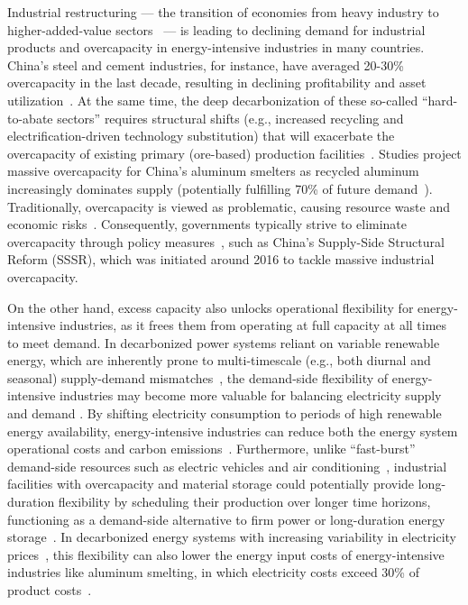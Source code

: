 \documentclass[preprint]{elsarticle}
\begin{document}
Industrial restructuring — the transition of economies from heavy industry to higher-added-value sectors~\citep{tan2024toward} — is leading to declining demand for industrial products and overcapacity in energy-intensive industries in many countries. China's steel and cement industries, for instance, have averaged 20-30\% overcapacity in the last decade, resulting in declining profitability and asset utilization~\citep{xie2023impact}. At the same time, the deep decarbonization of these so-called ``hard-to-abate sectors'' requires structural shifts (e.g., increased recycling and electrification-driven technology substitution) that will exacerbate the overcapacity of existing primary (ore-based) production facilities~\citep{nilsson_industrial_2021, meng_technologies_2025, bataille_review_2018, wesseling_transition_2017}. Studies project massive overcapacity for China's aluminum smelters as recycled aluminum increasingly dominates supply (potentially fulfilling 70\% of future demand~\citep{li_when_2020, liu_stock_2013}). Traditionally, overcapacity is viewed as problematic, causing resource waste and economic risks~\citep{yu2020environmental}. Consequently, governments typically strive to eliminate overcapacity through policy measures~\citep{guo2022uncovering}, such as China's Supply-Side Structural Reform (SSSR), which was initiated around 2016 to tackle massive industrial overcapacity.

On the other hand, excess capacity also unlocks operational flexibility for energy-intensive industries, as it frees them from operating at full capacity at all times to meet demand. In decarbonized power systems reliant on variable renewable energy, which are inherently prone to multi-timescale (e.g., both diurnal and seasonal) supply-demand mismatches~\citep{cole_quantifying_2021, denholm_challenges_2021}, the demand-side flexibility of energy-intensive industries may become more valuable for balancing electricity supply and demand \citep{kondziella2016flexibility}. By shifting electricity consumption to periods of high renewable energy availability, energy-intensive industries can reduce both the energy system operational costs and carbon emissions~\citep{golmohamadi_demand-side_2022}. Furthermore, unlike “fast-burst” demand-side resources such as electric vehicles and air conditioning~\citep{van_heerden_demand-side_2025}, industrial facilities with overcapacity and material storage could potentially provide long-duration flexibility by scheduling their production over longer time horizons, functioning as a demand-side alternative to firm power or long-duration energy storage~\citep{sepulveda_role_2018, jenkins_long-duration_2021}. In decarbonized energy systems with increasing variability in electricity prices~\citep{Bistline2021VariabilityID, dardor_modelling_2026}, this flexibility can also lower the energy input costs of energy-intensive industries like aluminum smelting, in which electricity costs exceed 30\% of product costs~\citep{CHALCO2020AnnualReport}.
\end{document}
